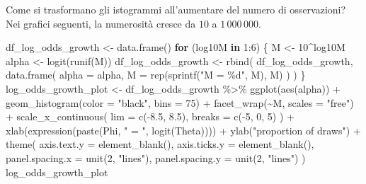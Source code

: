 \documentclass[
  11pt,
]{krantz}
\makeatletter
\newenvironment{Shaded}{\begin{snugshade}}{\end{snugshade}}
\newcommand{\AttributeTok}[1]{\textcolor[rgb]{0.61,0.61,0.61}{#1}}
\newcommand{\ControlFlowTok}[1]{\textcolor[rgb]{0.27,0.27,0.27}{\textbf{#1}}}
\newcommand{\DecValTok}[1]{\textcolor[rgb]{0.06,0.06,0.06}{#1}}
\newcommand{\FloatTok}[1]{\textcolor[rgb]{0.06,0.06,0.06}{#1}}
\newcommand{\FunctionTok}[1]{\textcolor[rgb]{0,0,0}{#1}}
\newcommand{\NormalTok}[1]{#1}
\newcommand{\OtherTok}[1]{\textcolor[rgb]{0.37,0.37,0.37}{#1}}
\newcommand{\SpecialCharTok}[1]{\textcolor[rgb]{0,0,0}{#1}}
\newcommand{\StringTok}[1]{\textcolor[rgb]{0.5,0.5,0.5}{#1}}
\newenvironment{kframe}{%
\medskip{}
\setlength{\fboxsep}{.8em}
 \def\at@end@of@kframe{}%
 \ifinner\ifhmode%
  \def\at@end@of@kframe{\end{minipage}}%
  \begin{minipage}{\columnwidth}%
 \fi\fi%
 \def\FrameCommand##1{\hskip\@totalleftmargin \hskip-\fboxsep
 \colorbox{shadecolor}{##1}\hskip-\fboxsep
     \hskip-\linewidth \hskip-\@totalleftmargin \hskip\columnwidth}%
 \MakeFramed {\advance\hsize-\width
   \@totalleftmargin\z@ \linewidth\hsize
   \@setminipage}}%
 {\par\unskip\endMakeFramed%
 \at@end@of@kframe}
\renewenvironment{Shaded}{\begin{kframe}}{\end{kframe}}
\theoremstyle{definition}
\theoremstyle{definition}
\theoremstyle{definition}
\theoremstyle{definition}
\theoremstyle{remark}
\makeatother
\begin{document}
Come si trasformano gli istogrammi all'aumentare del numero di osservazioni? Nei grafici seguenti, la numerosità cresce da \(10\) a \(1\,000\,000\).

\begin{Shaded}
\begin{Highlighting}[]
\NormalTok{df\_log\_odds\_growth }\OtherTok{\textless{}{-}} \FunctionTok{data.frame}\NormalTok{()}
\ControlFlowTok{for}\NormalTok{ (log10M }\ControlFlowTok{in} \DecValTok{1}\SpecialCharTok{:}\DecValTok{6}\NormalTok{) \{}
\NormalTok{  M }\OtherTok{\textless{}{-}} \DecValTok{10}\SpecialCharTok{\^{}}\NormalTok{log10M}
\NormalTok{  alpha }\OtherTok{\textless{}{-}} \FunctionTok{logit}\NormalTok{(}\FunctionTok{runif}\NormalTok{(M))}
\NormalTok{  df\_log\_odds\_growth }\OtherTok{\textless{}{-}} \FunctionTok{rbind}\NormalTok{(}
\NormalTok{    df\_log\_odds\_growth,}
    \FunctionTok{data.frame}\NormalTok{(}
      \AttributeTok{alpha =}\NormalTok{ alpha,}
      \AttributeTok{M =} \FunctionTok{rep}\NormalTok{(}\FunctionTok{sprintf}\NormalTok{(}\StringTok{"M = \%d"}\NormalTok{, M), M)}
\NormalTok{    )}
\NormalTok{  )}
\NormalTok{\}}
\NormalTok{log\_odds\_growth\_plot }\OtherTok{\textless{}{-}}
\NormalTok{  df\_log\_odds\_growth }\SpecialCharTok{\%\textgreater{}\%}
  \FunctionTok{ggplot}\NormalTok{(}\FunctionTok{aes}\NormalTok{(alpha)) }\SpecialCharTok{+}
  \FunctionTok{geom\_histogram}\NormalTok{(}\AttributeTok{color =} \StringTok{"black"}\NormalTok{, }\AttributeTok{bins =} \DecValTok{75}\NormalTok{) }\SpecialCharTok{+}
  \FunctionTok{facet\_wrap}\NormalTok{(}\SpecialCharTok{\textasciitilde{}}\NormalTok{M, }\AttributeTok{scales =} \StringTok{"free"}\NormalTok{) }\SpecialCharTok{+}
  \FunctionTok{scale\_x\_continuous}\NormalTok{(}
    \AttributeTok{lim =} \FunctionTok{c}\NormalTok{(}\SpecialCharTok{{-}}\FloatTok{8.5}\NormalTok{, }\FloatTok{8.5}\NormalTok{), }\AttributeTok{breaks =} \FunctionTok{c}\NormalTok{(}\SpecialCharTok{{-}}\DecValTok{5}\NormalTok{, }\DecValTok{0}\NormalTok{, }\DecValTok{5}\NormalTok{)}
\NormalTok{  ) }\SpecialCharTok{+}
  \FunctionTok{xlab}\NormalTok{(}\FunctionTok{expression}\NormalTok{(}\FunctionTok{paste}\NormalTok{(Phi, }\StringTok{" = "}\NormalTok{, }\FunctionTok{logit}\NormalTok{(Theta)))) }\SpecialCharTok{+}
  \FunctionTok{ylab}\NormalTok{(}\StringTok{"proportion of draws"}\NormalTok{) }\SpecialCharTok{+}
  \FunctionTok{theme}\NormalTok{(}
    \AttributeTok{axis.text.y =} \FunctionTok{element\_blank}\NormalTok{(),}
    \AttributeTok{axis.ticks.y =} \FunctionTok{element\_blank}\NormalTok{(),}
    \AttributeTok{panel.spacing.x =} \FunctionTok{unit}\NormalTok{(}\DecValTok{2}\NormalTok{, }\StringTok{"lines"}\NormalTok{),}
    \AttributeTok{panel.spacing.y =} \FunctionTok{unit}\NormalTok{(}\DecValTok{2}\NormalTok{, }\StringTok{"lines"}\NormalTok{)}
\NormalTok{  )}
\NormalTok{log\_odds\_growth\_plot}
\end{Highlighting}
\end{Shaded}
\end{document}
